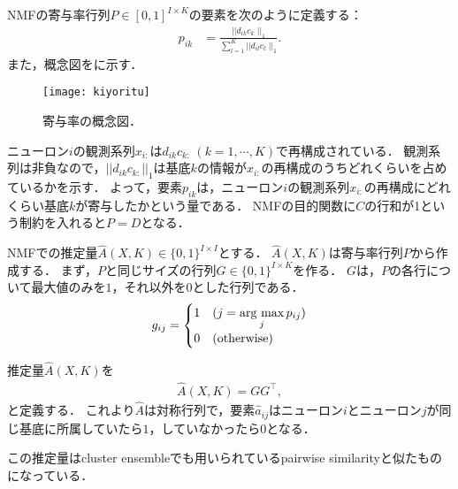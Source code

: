 NMFの寄与率行列$P \in [0,1]^{I \times K}$の要素を次のように定義する：
\begin{align}
	p_{ik} &= \frac{||d_{ik} c_{k:}||_1}{\sum_{l=1}^K || d_{il} c_{l:} ||_1}.
\end{align}
また，概念図をに示す．
\begin{figure}[htbp]
	\centering
	\texttt{[image: kiyoritu]}
	\caption{寄与率の概念図．}
	\label{fig:kiyoritu}
\end{figure}
ニューロン$i$の観測系列$x_{i:}$は$d_{ik}c_{k:} \ (k=1,\cdots,K)$で再構成されている．
観測系列は非負なので，$||d_{ik}c_{k:}||_1$は基底$k$の情報が$x_{i:}$の再構成のうちどれくらいを占めているかを示す．
よって，要素$p_{ik}$は，ニューロン$i$の観測系列$x_{i:}$の再構成にどれくらい基底$k$が寄与したかという量である．
NMFの目的関数に$C$の行和が1という制約を入れると$P=D$となる．

NMFでの推定量$\hat{A}(X,K) \in \{0,1\}^{I \times I}$とする．
$\hat{A}(X,K)$は寄与率行列$P$から作成する．
まず，$P$と同じサイズの行列$G \in \{0, 1\}^{I \times K}$を作る．
$G$は，$P$の各行について最大値のみを$1$，それ以外を$0$とした行列である．
\begin{align}
	g_{ij} = \begin{cases}
		1 & (j = \mathop{\textrm{arg~max}}\limits_{j}p_{ij}) \\
		0 & (\text{otherwise})
	\end{cases}
\end{align}

推定量$\hat{A}(X,K)$を
\begin{align}
	\hat{A}(X,K) = G G^{\top},
\end{align}
と定義する．
これより$\hat{A}$は対称行列で，要素$\hat{a}_{ij}$はニューロン$i$とニューロン$j$が同じ基底に所属していたら$1$，していなかったら$0$となる．

この推定量はcluster ensembleでも用いられているpairwise similarity\cite{Boongoen2018}と似たものになっている．

